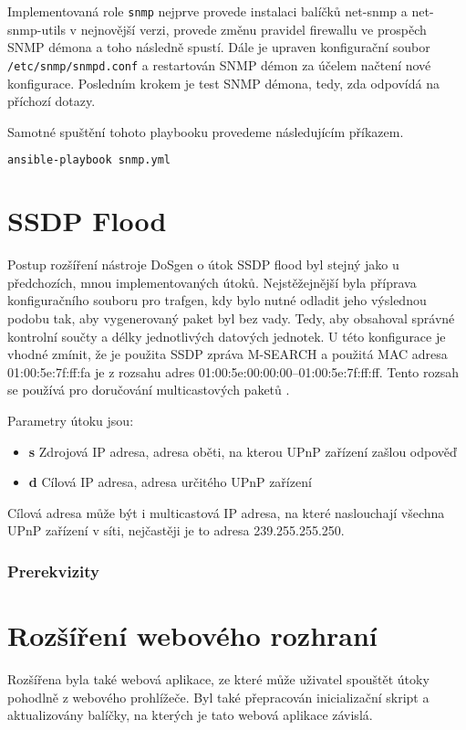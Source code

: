 Implementovaná role \texttt{snmp} nejprve provede instalaci balíčků net-snmp a net-snmp-utils v nejnovější verzi, provede změnu pravidel firewallu ve prospěch SNMP démona a toho následně spustí. Dále je upraven konfigurační soubor \texttt{/etc/snmp/snmpd.conf} a restartován SNMP démon za účelem načtení nové konfigurace. Posledním krokem je test SNMP démona, tedy, zda odpovídá na příchozí dotazy.

Samotné spuštění tohoto playbooku provedeme následujícím příkazem.

\begin{lstlisting}[language=bash]
ansible-playbook snmp.yml
\end{lstlisting}

\section{SSDP Flood}
Postup rozšíření nástroje DoSgen o útok SSDP flood byl stejný jako u předchozích, mnou implementovaných útoků. Nejstěžejnější byla příprava konfiguračního souboru pro trafgen, kdy bylo nutné odladit jeho výslednou podobu tak, aby vygenerovaný paket byl bez vady. Tedy, aby obsahoval správné kontrolní součty a délky jednotlivých datových jednotek. U této konfigurace je vhodné zmínit, že je použita SSDP zpráva M-SEARCH a použitá MAC adresa 01:00:5e:7f:ff:fa je z rozsahu adres 01:00:5e:00:00:00–01:00:5e:7f:ff:ff. Tento rozsah se používá pro doručování multicastových paketů \cite{Deering1989}. 

\noindent Parametry útoku jsou:
\begin{itemize}
	\item \textbf{s} Zdrojová IP adresa, adresa oběti, na kterou UPnP zařízení zašlou odpověď
	\item \textbf{d} Cílová IP adresa, adresa určitého UPnP zařízení
\end{itemize}

Cílová adresa může být i multicastová IP adresa, na které naslouchají všechna UPnP zařízení v síti, nejčastěji je to adresa 239.255.255.250.

\subsubsection{Prerekvizity}



\section{Rozšíření webového rozhraní}
Rozšířena byla také webová aplikace, ze které může uživatel spouštět útoky pohodlně z webového prohlížeče. Byl také přepracován inicializační skript a aktualizovány balíčky, na kterých je tato webová aplikace závislá.

